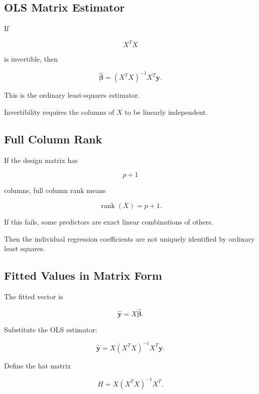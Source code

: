 \subsection{OLS Matrix Estimator}
\label{subsec:ols-matrix-estimator}

If

\[
X^TX
\]

is invertible, then

\[
\boxed{
\widehat{\boldsymbol{\beta}}
=
(X^TX)^{-1}
X^T\mathbf{y}.
}
\]

This is the ordinary least-squares estimator.

Invertibility requires the columns of \(X\) to be linearly independent.

\subsection{Full Column Rank}
\label{subsec:full-column-rank-regression}

If the design matrix has

\[
p+1
\]

columns, full column rank means

\[
\boxed{
\operatorname{rank}(X)
=
p+1.
}
\]

If this fails, some predictors are exact linear combinations of others.

Then the individual regression coefficients are not uniquely
identified by ordinary least squares.

\subsection{Fitted Values in Matrix Form}
\label{subsec:fitted-values-matrix}

The fitted vector is

\[
\boxed{
\widehat{\mathbf{y}}
=
X
\widehat{\boldsymbol{\beta}}.
}
\]

Substitute the OLS estimator:

\[
\widehat{\mathbf{y}}
=
X
(X^TX)^{-1}
X^T
\mathbf{y}.
\]

Define the hat matrix

\[
\boxed{
H
=
X
(X^TX)^{-1}
X^T.
}
\]

